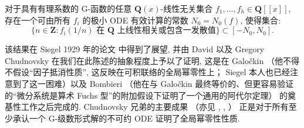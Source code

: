 \begin{theorem}\label{thm:15.1.3}
对于具有有理系数的 G-函数的任意 \(\mathbf{Q}(x)\)-线性无关集合 \(f_1, \dots, f_h \in \mathbf{Q}[\![x]\!]\), 
存在一个可由所有 \(f_i\) 的极小 ODE 有效计算的常数 \(N_0 = N_0(f)\), 
使得集合:
\begin{equation}\label{eq:15.1.4}
\{n \in \mathbf{Z} : f_i(1/n) \text{ 在 } \mathbf{Q} \text{ 上线性相关或包含一发散值}\} \subset [-N_0, N_0].
\end{equation}
\end{theorem}

该结果在 Siegel 1929 年的论文 \cite[第 VII 节]{Zan14} 中得到了展望, 
并由 David 以及 Gregory Chudnovsky \cite{CC85a} 在我们在此陈述的抽象程度上予以了证明, 
这是在 Galo{\v{c}}kin \cite{Gal74} （他不得不假设“因子抵消性质”, 
这反映在可积联络的全局幂零性上； 
Siegel 本人也已经注意到了这一困难）以及 Bombieri \cite{Bom81} （他在与 Galo{\v{c}}kin 最终等价的、但更容易验证的“微分系统是算术 Fuchs 型”的附加假设下证明了一个通用的阿代尔定理） 
的奠基性工作之后完成的. 
Chudnovsky 兄弟的主要成果 \cite[定理 III]{CC85a}（亦见 \cite[定理 VIII.1.5]{DGS94}, \cite[第 VI 节]{And89}, \cite{DV01}） 
正是对于所有至少承认一个 G-级数形式解的不可约 ODE 证明了全局幂零性性质.

